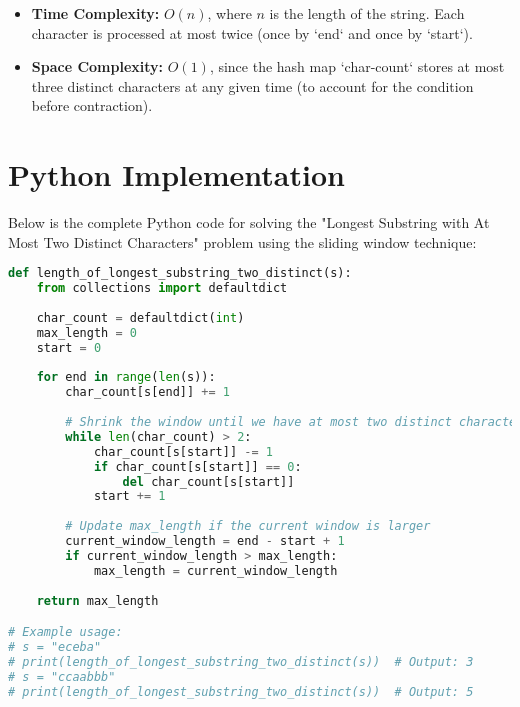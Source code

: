 \begin{itemize}
    \item \textbf{Time Complexity:} \(O(n)\), where \(n\) is the length of the string. Each character is processed at most twice (once by `end` and once by `start`).
    \item \textbf{Space Complexity:} \(O(1)\), since the hash map `char-count` stores at most three distinct characters at any given time (to account for the condition before contraction).
\end{itemize}

\section*{Python Implementation}


Below is the complete Python code for solving the "Longest Substring with At Most Two Distinct Characters" problem using the sliding window technique:

\begin{fullwidth}
\begin{lstlisting}[language=Python]
def length_of_longest_substring_two_distinct(s):
    from collections import defaultdict
    
    char_count = defaultdict(int)
    max_length = 0
    start = 0
    
    for end in range(len(s)):
        char_count[s[end]] += 1
        
        # Shrink the window until we have at most two distinct characters
        while len(char_count) > 2:
            char_count[s[start]] -= 1
            if char_count[s[start]] == 0:
                del char_count[s[start]]
            start += 1
        
        # Update max_length if the current window is larger
        current_window_length = end - start + 1
        if current_window_length > max_length:
            max_length = current_window_length
    
    return max_length

# Example usage:
# s = "eceba"
# print(length_of_longest_substring_two_distinct(s))  # Output: 3
# s = "ccaabbb"
# print(length_of_longest_substring_two_distinct(s))  # Output: 5
\end{lstlisting}
\end{fullwidth}

